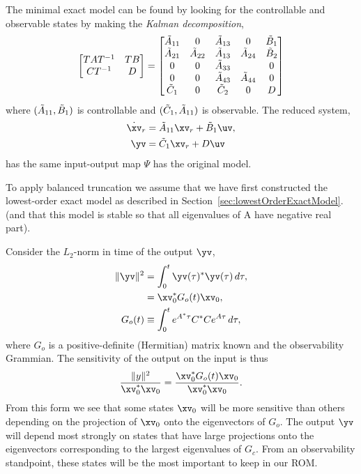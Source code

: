 The minimal exact model can be found by looking for the controllable and observable
states by making the {\em Kalman decomposition}, 
\begin{align}
\begin{bmatrix}
    T A T^{-1} & T B \\
    C T^{-1}   &  D 
\end{bmatrix}
=
\begin{bmatrix}
    \tilde{A}_{11} &     0    & \tilde{A}_{13} & 0        & \tilde{B}_1 \\
    \tilde{A}_{21} & \tilde{A}_{22} & \tilde{A}_{13} & \tilde{A}_{24} & \tilde{B}_2 \\
       0     &    0     & \tilde{A}_{33} &          &   0   \\
       0     &    0     & \tilde{A}_{43} & \tilde{A}_{44} &   0   \\
     \tilde{C}_1   &    0     & \tilde{C}_2    &   0      &   D 
\end{bmatrix}
\end{align}
where $(\tilde{A}_{11},\tilde{B}_1)$ is controllable and $(\tilde{C}_1,\tilde{A}_{11})$ is observable.
The reduced system,
\begin{align}
    \dot\xv_r &= \At_{11} \xv_r + \Bt_1 \uv ,\\
     \yv &= \Ct_1 \xv_r + D \uv 
\end{align}
has the same input-output map $\Psi$ has the original model.


To apply balanced truncation we assume that we have first constructed the 
lowest-order exact model as described in Section~\ref{sec:lowestOrderExactModel}.
(and that this model is stable so that all eigenvalues of A have negative real part).


Consider the $L_2$-norm in time of the output $\yv$,
\begin{align}
    \| \yv \|^2 &= \int_0^t \yv(\tau)^* \yv(\tau) \,d\tau, \\
                &= \xv_0^* G_o(t) \xv_0  , \label{eq:sensitivityObserve}  \\
      G_o(t) &\equiv \int_0^t e^{A^*\tau} C^* C e^{A \tau} \,d\tau, 
\end{align}
where $G_o$ is a positive-definite (Hermitian) matrix known and the observability Grammian. 
The sensitivity of the output on the input is thus
\begin{align}
    \frac{\| y \|^2}{\xv_0^*\xv_0} = \frac{\xv_0^* G_o(t) \xv_0}{\xv_0^*\xv_0}.
\end{align}
From this form we see that some states $\xv_0$ will be more sensitive than others depending 
on the projection of $\xv_0$ onto the eigenvectors of $G_o$. The output $\yv$ will depend
most strongly on states that have large projections onto the eigenvectors corresponding to the 
largest eigenvalues of $G_c$. 
From an observability standpoint, these states will be the most important to keep in our ROM. 


